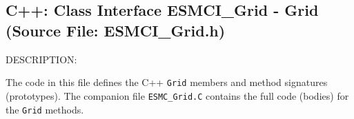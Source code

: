  
\setlength{\oldparskip}{\parskip}
\setlength{\parskip}{1.5ex}
\setlength{\oldparindent}{\parindent}
\setlength{\parindent}{0pt}
\setlength{\oldbaselineskip}{\baselineskip}
\setlength{\baselineskip}{11pt}
 
\def\bv{\begin{verbatim}}
\def\ev{\end{verbatim}}
\def\be{\begin{equation}}
\def\ee{\end{equation}}
\def\bea{\begin{eqnarray}}
\def\eea{\end{eqnarray}}
\def\bi{\begin{itemize}}
\def\ei{\end{itemize}}
\def\bn{\begin{enumerate}}
\def\en{\end{enumerate}}
\def\bd{\begin{description}}
\def\ed{\end{description}}
\def\({\left (}
\def\){\right )}
\def\[{\left [}
\def\]{\right ]}
\def\<{\left  \langle}
\def\>{\right \rangle}
\def\cI{{\cal I}}
\def\diag{\mathop{\rm diag}}
\def\tr{\mathop{\rm tr}}


 
\subsection{C++:  Class Interface ESMCI\_Grid - Grid (Source File: ESMCI\_Grid.h)}


  
{\sf DESCRIPTION:\\ }


  
   The code in this file defines the C++ {\tt Grid} members and method
   signatures (prototypes).  The companion file {\tt ESMC\_Grid.C}
   contains the full code (bodies) for the {\tt Grid} methods.
  
